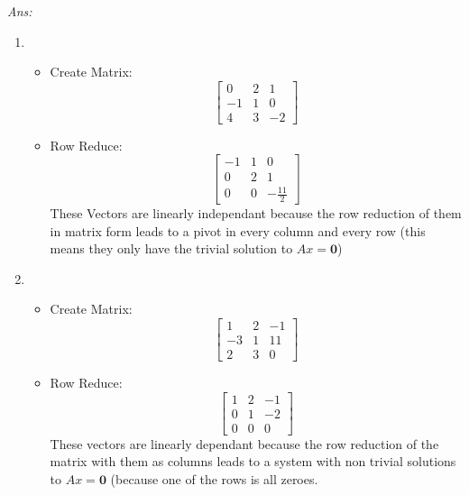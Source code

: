 \documentclass[12pt]{amsart}
\newcommand{\bo}{\mathbf{0}}
\newcommand\sol[1]{
\medskip
\begin{mdframed}
\emph{Ans:\\} #1
\end{mdframed}
\medskip
}
\begin{document}
\begin{enumerate}
  \sol{
    \begin{enumerate}
      \item
        \begin{itemize}
          \item Create Matrix:\\
            $$\left[\begin{matrix} 0 & 2 & 1 \\ -1 & 1 & 0 \\ 4 & 3 & -2 \end{matrix}\right]$$
          \item Row Reduce:\\
            $$\left[\begin{matrix} -1 & 1 & 0 \\ 0 & 2 & 1 \\ 0 & 0 & -\frac{11}{2} \end{matrix}\right]$$
            These Vectors are linearly independant because the row reduction of them in matrix form leads to a pivot in every column and every row (this means they only have the trivial solution to $Ax=\bo$)
        \end{itemize}
      \item
        \begin{itemize}
          \item Create Matrix:\\
            $$\left[\begin{matrix} 1 & 2 & -1 \\ -3 & 1 & 11 \\ 2 & 3 & 0 \end{matrix}\right]$$
          \item Row Reduce:\\
            $$\left[\begin{matrix} 1 & 2 & -1 \\ 0 & 1 & -2 \\ 0 & 0 & 0 \end{matrix}\right]$$
            These vectors are linearly dependant because the row reduction of the matrix with them as columns leads to a system with non trivial solutions to $Ax=\bo$ (because one of the rows is all zeroes.
        \end{itemize}
  \end{enumerate}
  }







\end{enumerate}
\end{document}
